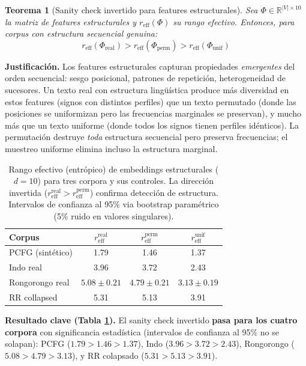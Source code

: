 \documentclass[11pt,a4paper]{article}
\newtheorem{theorem}{Teorema}[section]
\newcommand{\R}{\mathbb{R}}
\newcommand{\1}{\mathbf{1}}
\numberwithin{equation}{section}
\begin{document}
\begin{theorem}[Sanity check invertido para features estructurales]
\label{thm:structural_sanity}
Sea $\Phi \in \R^{|V| \times 10}$ la matriz de features estructurales y $r_{\text{eff}}(\Phi)$ su rango efectivo. Entonces, para corpus con estructura secuencial genuina:
\begin{equation}
r_{\text{eff}}(\Phi_{\text{real}}) > r_{\text{eff}}(\Phi_{\text{perm}}) > r_{\text{eff}}(\Phi_{\text{unif}})
\end{equation}
\end{theorem}

\textbf{Justificación.} Los features estructurales capturan propiedades \emph{emergentes} del orden secuencial: sesgo posicional, patrones de repetición, heterogeneidad de sucesores. Un texto real con estructura lingüística produce más diversidad en estos features (signos con distintos perfiles) que un texto permutado (donde las posiciones se uniformizan pero las frecuencias marginales se preservan), y mucho más que un texto uniforme (donde todos los signos tienen perfiles idénticos). La permutación destruye \emph{toda} estructura secuencial pero preserva frecuencias; el muestreo uniforme elimina incluso la estructura marginal.

\begin{table}[h]
\centering
\caption{Rango efectivo (entrópico) de embeddings estructurales ($d=10$) para tres corpora y sus controles. La dirección invertida ($r_{\text{eff}}^{\text{real}} > r_{\text{eff}}^{\text{perm}}$) confirma detección de estructura. Intervalos de confianza al 95\% via bootstrap paramétrico (5\% ruido en valores singulares).}
\label{tab:structural_sanity}
\begin{tabular}{lccc}
\toprule
Corpus & $r_{\text{eff}}^{\text{real}}$ & $r_{\text{eff}}^{\text{perm}}$ & $r_{\text{eff}}^{\text{unif}}$ \\
\midrule
PCFG (sintético) & 1.79 & 1.46 & 1.37 \\
Indo real & 3.96 & 3.72 & 2.43 \\
Rongorongo real & $5.08 \pm 0.21$ & $4.79 \pm 0.21$ & $3.13 \pm 0.19$ \\
\midrule
RR collapsed & 5.31 & 5.13 & 3.91 \\
\bottomrule
\end{tabular}
\end{table}

\textbf{Resultado clave (Tabla \ref{tab:structural_sanity}).} El sanity check invertido \textbf{pasa para los cuatro corpora} con significancia estadística (intervalos de confianza al 95\% no se solapan): PCFG ($1.79 > 1.46 > 1.37$), Indo ($3.96 > 3.72 > 2.43$), Rongorongo ($5.08 > 4.79 > 3.13$), y RR colapsado ($5.31 > 5.13 > 3.91$).
\end{document}
